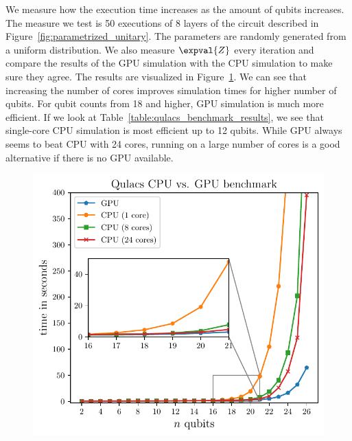 \documentclass[a4paper,10pt]{article}
\begin{document}
\begin{appendices}
We measure how the execution time increases as the amount of qubits increases.
The measure we test is 50 executions of 8 layers of the circuit described in Figure~\ref{fig:parametrized_unitary}.
The parameters are randomly generated from a uniform distribution.
We also measure $\expval{Z}$ every iteration and compare the results of the GPU simulation with the CPU simulation to make sure they agree.
The results are visualized in Figure~\ref{fig:qulacs_benchmark}.
We can see that increasing the number of cores improves simulation times for higher number of qubits.
For qubit counts from 18 and higher, GPU simulation is much more efficient.
If we look at Table~\ref{table:qulacs_benchmark_results}, we see that single-core CPU simulation is most efficient up to 12 qubits.
While GPU always seems to beat CPU with 24 cores, running on a large number of cores is a good alternative if there is no GPU available.

\begin{figure}[ht]
	\centering
	\includegraphics[width=0.6\linewidth]{figures/qnn_cpu_vs_gpu.pdf}
	\label{fig:qulacs_benchmark}
\end{figure}


\end{appendices}
\end{document}
